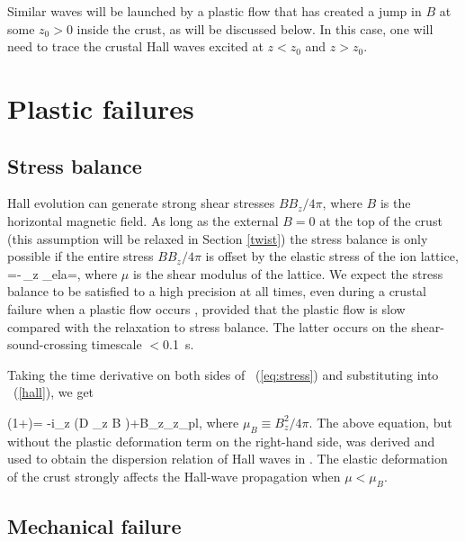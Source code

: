 Similar waves will be launched by a plastic flow that has created a jump in $B$ at 
some $z_0>0$ inside the crust, as will be discussed below. In this case, one will need to 
trace the crustal Hall waves excited at $z<z_0$ and $z>z_0$.

\section{Plastic failures}\label{plastic}

\subsection{Stress balance}

Hall evolution can generate strong shear stresses $BB_z/4\pi$, where 
$B$ is the horizontal magnetic field.
As long as the external $B=0$ at the top of the crust (this assumption will be relaxed in 
Section \ref{twist}) the stress balance is only possible 
if the entire stress $BB_z/4\pi$ is offset by the elastic stress of the ion lattice,
\beq
\label{eq:stress}
   =-\mu\,\partial_z \xi_{\rm ela}=\sigma,
\eeq
where $\mu$ is the shear modulus of the lattice. We expect the stress balance 
to be satisfied to a high precision at all times, even during a crustal failure when a plastic flow occurs \citep{2014ApJ...794L..24B}, provided that the plastic flow is slow compared with the relaxation to stress balance. The latter occurs on the shear-sound-crossing timescale $<$0.1~s. 

Taking the time derivative on both sides 
of \Eq~(\ref{eq:stress}) and substituting
into \Eq~(\ref{hall}), we get
 
\beq
\label{eq:evol}
\left(1+\right)= -i\partial_z \left(D {\partial_z B} \right)+B_z\partial_z\dot{\xi}_{\rm pl},
\eeq
where $\mu_B\equiv B_z^2/4\pi$.
The above equation,
but without the plastic deformation term on the right-hand side, was derived 
and used to obtain the dispersion relation of  
Hall waves in \citet{2004ApJ...609..999C}. The elastic deformation of the crust strongly affects the Hall-wave propagation when $\mu<\mu_B$.

\subsection{Mechanical failure}\label{mechanical}


